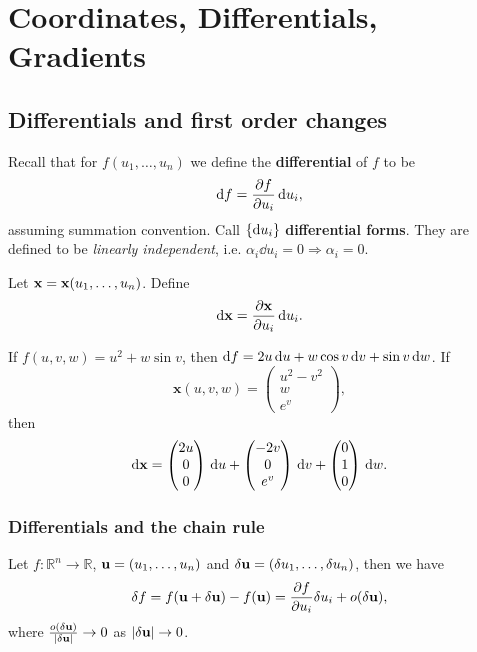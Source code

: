\section{Coordinates, Differentials, Gradients}
\subsection{Differentials and first order changes}

Recall that for $ f(u_1,\dots,u_n) $ we define the \textbf{differential} of $f$ to be 
\[
    \mathrm{d} f = \frac{\partial f}{\partial u_i} \,\mathrm{d} u_i, 
\]
assuming summation convention. Call $ \{\mathrm{d} u_i\} $ \textbf{differential forms}. They are defined to be \textit{linearly independent}, i.e. $ \alpha_i \dd u_i =0 \Rightarrow \alpha_i=0 $.
\begin{definition}
    Let ${\bf x} = {\bf x}(u_1,\dots,u_n)$. Define
    \[
        \mathrm{d} {\bf x}= \frac{\partial {\bf x}}{\partial u_i} \,\mathrm{d} u_i. 
    \]
\end{definition}

\begin{example}
    If $f(u,v,w)=u^2+w\sin v$, then $ \mathrm{d} f = 2u\,\mathrm{d} u+w \cos v \,\mathrm{d} v+ \sin v \,\mathrm{d} w $. If 
    \[
        \mathbf{x}(u,v,w)=\begin{pmatrix}
            u^2-v^2 \\ w \\ e^v
        \end{pmatrix},
    \] 
    then 
    \[
        \mathrm{d} \mathbf{x} = \begin{pmatrix}
            2u \\ 0 \\ 0
        \end{pmatrix}\,\mathrm{d} u+ \begin{pmatrix}
            -2v \\ 0 \\ e^v
        \end{pmatrix}\,\mathrm{d} v+\begin{pmatrix}
            0 \\ 1 \\ 0
        \end{pmatrix}\,\mathrm{d} w.
    \]
\end{example}

\subsubsection*{Differentials and the chain rule}
Let $ f: \mathbb{R}^{n}\to \mathbb{R} $, ${\bf u}=(u_1,\dots,u_n)$ and $ \delta{\bf u}=(\delta u_1,\dots,\delta u_n) $, then we have 
\[
    \delta f=f({\bf u}+\delta{\bf u})-f({\bf u})=\frac{\partial f}{\partial u_i}\delta u_i +o(\delta{\bf u}),
\]
where $ \frac{o(\delta{\bf u})}{|\delta{\bf u}|}\to 0 $ as $ |\delta{\bf u}|\to 0 $.

